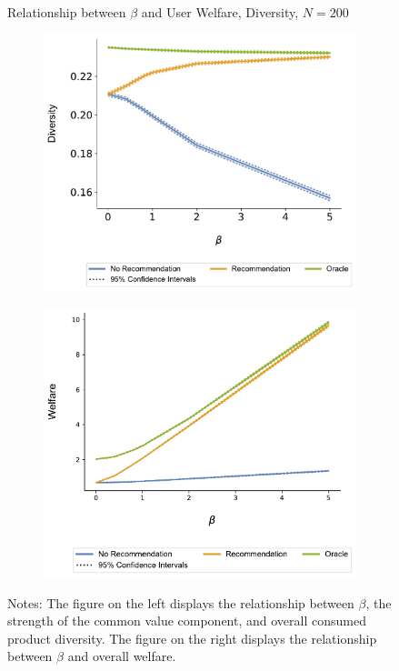 \documentclass[format=acmsmall, review=true]{acmart}
\begin{document}
\begin{figure}[ht]
\caption{Relationship between $\beta$ and User Welfare, Diversity, $N = 200$}\label{fig:diversity_welfare_correlation}
\begin{subfigure}{.45\linewidth}
  \includegraphics[width=.8\linewidth]{figures/beta_diversity_N_200_T_20.pdf}
\end{subfigure}
\ContinuedFloat
\begin{subfigure}{.45\linewidth}
  \includegraphics[width=.8\linewidth]{figures/beta_welfare_N_200_T_20.pdf}
\end{subfigure}
\caption*{\scriptsize Notes: The figure on the left displays the relationship between $\beta$, the strength of the common value component, and overall consumed product diversity. The figure on the right displays the relationship between $\beta$ and overall welfare.}
\end{figure}
\end{document}
